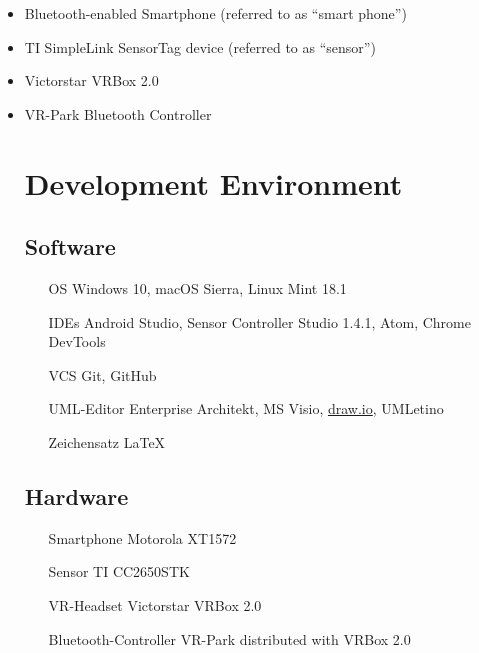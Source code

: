 \begin{itemize}
  \item Bluetooth-enabled Smartphone (referred to as ``smart phone'')
  \item TI SimpleLink SensorTag device (referred to as ``sensor'')
  \item Victorstar VRBox 2.0
  \item VR-Park Bluetooth Controller


  \section{Development Environment}

  \subsection{Software}

  \begin{itemize}
    \item[OS] Windows 10, macOS Sierra, Linux Mint 18.1
    \item[IDEs]  Android Studio, Sensor Controller Studio 1.4.1, Atom, Chrome DevTools
    \item[VCS] Git, GitHub
    \item[UML-Editor] Enterprise Architekt, MS Visio, \href{draw.io}{draw.io}, UMLetino
    \item[Zeichensatz] \LaTeX

  \end{itemize}

  \subsection{Hardware}

  \begin{itemize}
    \item[Smartphone] Motorola XT1572
    \item[Sensor] TI CC2650STK
    \item[VR-Headset] Victorstar VRBox 2.0
    \item[Bluetooth-Controller] VR-Park distributed with VRBox 2.0
  \end{itemize}
\end{itemize}
